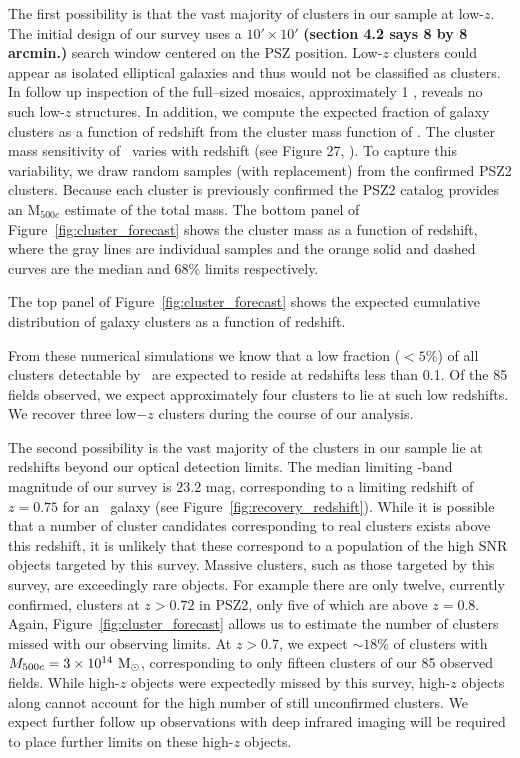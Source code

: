 \documentclass[apj, revtex4-1]{emulateapj}
\begin{document}
The first possibility is that the vast majority of clusters in our sample at low-$z$. The initial design of our survey uses a $10'\times10'$ {\bf (section 4.2 says 8 by 8 arcmin.)}  search window centered on the PSZ position. Low-$z$ clusters could appear as isolated elliptical galaxies and thus would not be classified as clusters. In follow up inspection of the full--sized mosaics, approximately 1 \degsq, reveals no such low-$z$ structures. In addition, we compute the expected fraction of galaxy clusters as a function of redshift from the cluster mass function of \cite{Tinker2008}. The cluster mass sensitivity of \planck\ varies with redshift (see Figure 27, \citealt{PlanckCollaboration2015a}). To capture this variability, we draw random samples (with replacement)  from the confirmed PSZ2 clusters. Because each cluster is previously confirmed the PSZ2 catalog provides an M$_{500c}$ estimate of the total mass. The bottom panel of Figure~\ref{fig:cluster_forecast} shows the cluster mass as a function of redshift, where the gray lines are individual samples and the orange solid and dashed curves are the median and 68\% limits respectively.

The top panel of Figure~\ref{fig:cluster_forecast} shows the expected cumulative distribution of galaxy clusters as a function of redshift.

From these numerical simulations we know that a low fraction ($<5\%$) of all clusters detectable by \planck\ are expected to reside at redshifts less than 0.1. Of the 85 fields observed, we expect approximately four clusters to lie at such low redshifts. We recover three low$-z$ clusters during the course of our analysis.

The second possibility is the vast majority of the clusters in our sample lie at redshifts beyond our optical detection limits. The median limiting \sdssi-band magnitude of our survey is $23.2$ mag, corresponding to a limiting redshift of $z=0.75$ for an \mstar\ galaxy (see Figure~\ref{fig:recovery_redshift}). While it is possible that a number of cluster candidates corresponding to real clusters exists above this redshift, it is unlikely that these correspond to a population of the high SNR objects targeted by this survey. Massive clusters, such as those targeted by this survey, are exceedingly rare objects. For example there are only twelve, currently confirmed, clusters at $z>0.72$ in PSZ2, only five of which are above $z=0.8$. Again, Figure~\ref{fig:cluster_forecast} allows us to estimate the number of clusters missed with our observing limits. At $z>0.7$, we expect $\sim18\%$ of clusters with $M_{500c}=3\times10^{14}~\hbox{$\mathrm{M}_\odot$}$, corresponding to only fifteen clusters of our 85 observed fields. While high-$z$ objects were expectedly missed by this survey, high-$z$ objects along cannot account for the high number of still unconfirmed clusters. We expect further follow up observations with deep infrared imaging will be required to place further limits on these high-$z$ objects.
\end{document}
